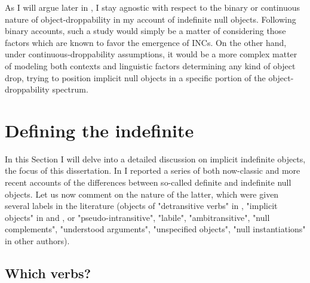 As I will argue later in , I stay agnostic with respect to the binary or continuous nature of object-droppability in my account of indefinite null objects. Following binary accounts, such a study would simply be a matter of considering those factors which are known to favor the emergence of INCs. On the other hand, under continuous-droppability assumptions, it would be a more complex matter of modeling both contexts and linguistic factors determining any kind of object drop, trying to position implicit null objects in a specific portion of the object-droppability spectrum.


\section{Defining the indefinite} 

In this Section I will delve into a detailed discussion on implicit indefinite objects, the focus of this dissertation. In  I reported a series of both now-classic and more recent accounts of the differences between so-called definite and indefinite null objects. Let us now comment on the nature of the latter, which were given several labels in the literature (objects of "detransitive verbs" in \textcite[46]{Yasutake1987}, "implicit objects" in \textcite{Glass2013} and \textcite[29]{PethoKardos2006}, or "pseudo-intransitive", "labile", "ambitransitive", "null complements", "understood arguments", "unspecified objects", "null instantiations" in other authors).


\subsection{Which verbs?} 

